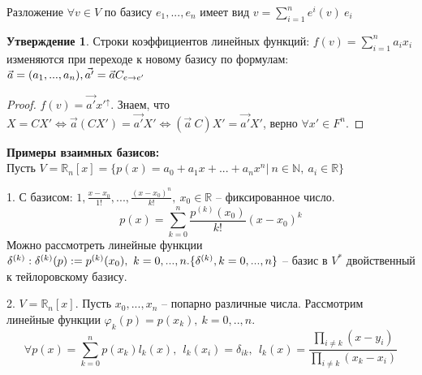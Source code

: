 \documentclass[a4paper, 12pt]{article}
\theoremstyle{definition}
\newtheorem*{subtheorem}{Утверждение}
\begin{document}
    Разложение $\forall v \in V$ по базису $e_1,..., e_n$ имеет
    вид $v = \sum\limits_{i=1}^ne^i(v)\ e_i$
    \begin{subtheorem}
        Строки коэффициентов линейных функций: $f(v) =
        \sum\limits_{i=1}^na_ix_i$ изменяются при переходе к
        новому базису по формулам: $\vec a = (a_1,..., a_n),\\
        \vec{a'} = \vec a C_{e\to e'}$
    \end{subtheorem}
    \begin{proof}
        $f(v) = \vec{a'}x'^{\uparrow}$. Знаем, что $X = CX'
        \Longleftrightarrow \vec a(CX') = \vec{a'}X'
        \Longleftrightarrow (\vec a\ C)X' = \vec{a'}X'$, верно
        $\forall x' \in F^n.$
    \end{proof}
    \textbf{Примеры взаимных базисов:}\\Пусть $V = \mathbb{R}_n
    [x] = \{p(x) = a_0 + a_1x +...+ a_nx^n|\ n \in \mathbb{N},\ 
    a_i \in \mathbb{R}\}$

    1. С базисом: $1, \frac{x - x_0}{1!},..., \frac{(x-x_0)^n}{k!},
    \ x_0 \in \mathbb{R}$ -- фиксированное число.
    $$p(x) = \sum\limits_{k=0}^n \frac{p^{(k)}(x_0)}{k!}(x-x_0)^k$$
    Можно рассмотреть линейные функции $\delta^{(k)}: \delta^{(k)}
    (p) := p^{(k)}(x_0),\ k = 0,...,n.\\
    \{\delta^{(k)}, k = 0,...,n\}$ -- базис в $V^*$ двойственный
    к тейлоровскому базису.

    2. $V = \mathbb{R}_n[x]$. Пусть $x_0,...,x_n$ -- попарно
    различные числа. Рассмотрим\\ линейные функции
    $\varphi_k(p) = p(x_k),\ k = 0,.., n.$
    $$\forall p(x) = \sum\limits_{k=0}^np(x_k)l_k(x),\ \ l_k(x_i)
    = \delta_{ik},\ \ l_k(x) = \frac{\prod_{i\neq k}(x - y_i)}
    {\prod_{i\neq k}(x_k - x_i)}$$
\end{document}

